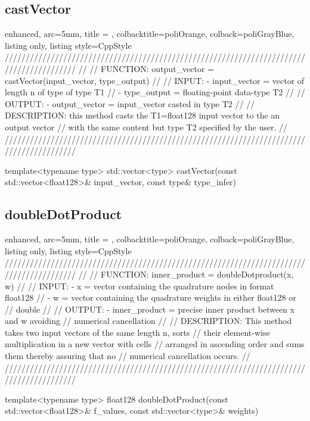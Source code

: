 \documentclass[a4paper, twosided]{book}
\begin{document}
\subsection[castVector]{\changefont castVector}\label{SubSec4.3.1}

\begin{tcblisting}{enhanced,
                   arc=5mm,
                   title = \color{black}{\large \ttfamily VecOps.cpp/castVector},
                   colbacktitle=poliOrange,
                   colback=poliGrayBlue,
                   listing only,
                   listing style=CppStyle}
/////////////////////////////////////////////////////////////////////////////////////////
//
//       FUNCTION: output_vector = castVector(input_vector, type_output)
//                
//          INPUT: - input_vector = vector of length n of type of type T1
//                 - type_output = floating-point data-type T2
//
//         OUTPUT: - output_vector = input_vector casted in type T2
//
//    DESCRIPTION: this method casts the T1=float128 input vector to the an output vector
//                 with the same content but type T2 specified by the user.
//
/////////////////////////////////////////////////////////////////////////////////////////

template<typename type>
std::vector<type> castVector(const std::vector<float128>& input_vector, const type& type_infer)
\end{tcblisting}

\subsection[doubleDotProduct]{\changefont doubleDotProduct}\label{SubSec4.3.2}

\begin{tcblisting}{enhanced,
                   arc=5mm,
                   title = \color{black}{\large \ttfamily Utils.cpp/doubleDotProduct},
                   colbacktitle=poliOrange,
                   colback=poliGrayBlue,
                   listing only,
                   listing style=CppStyle}
/////////////////////////////////////////////////////////////////////////////////////////
//
//       FUNCTION: inner_product = doubleDotproduct(x, w)
//                
//          INPUT: - x = vector containing the quadrature nodes in format float128
//                 - w = vector containing the quadrature weights in either float128 or 
//                       double
//
//         OUTPUT: - inner_product = precise inner product between x and w avoiding
//                                   numerical cancellation
//
//    DESCRIPTION: This method takes two input vectors of the same length n, sorts
//                 their element-wise multiplication in a new vector with cells
//                 arranged in ascending order and sums them thereby assuring that no 
//                 numerical cancellation occurs.
//
/////////////////////////////////////////////////////////////////////////////////////////

template<typename type>
float128 doubleDotProduct(const std::vector<float128>& f_values, const std::vector<type>& weights)
\end{tcblisting}
\end{document}
